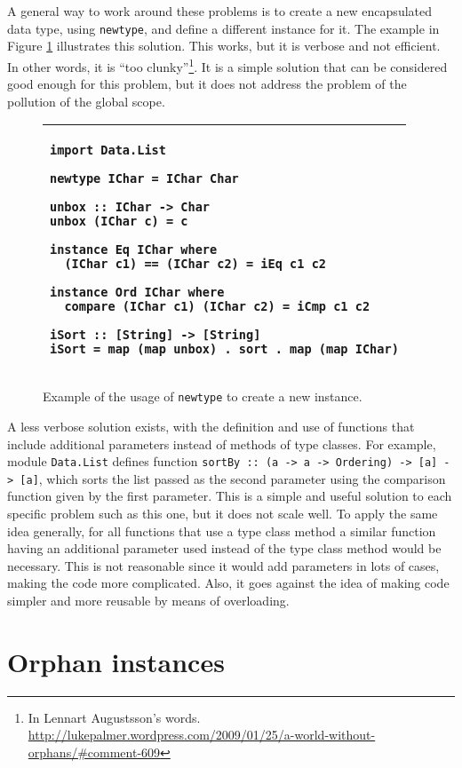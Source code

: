 \documentclass[msc]{ppgccufmg}
\begin{document}
A general way to work around these problems is to create a new encapsulated data type, using \texttt{newtype}, and define a different instance for it.
The example in Figure \ref{newtype} illustrates this solution.  This works, but
it is verbose and not efficient.  In other words, it is ``too
clunky''\footnote{In Lennart Augustsson's
  words. \url{http://lukepalmer.wordpress.com/2009/01/25/a-world-without-orphans/\#comment-609}}.  It is a simple solution that can be considered good enough
for this problem, but it does not address the problem of the pollution of the global
scope.

\begin{figure}
\caption{Example of the usage of \texttt{newtype} to create a new
  instance.\label{newtype}}
\begin{tabular}{|p{\textwidth}|}
\hline
\begin{verbatim}
import Data.List

newtype IChar = IChar Char

unbox :: IChar -> Char
unbox (IChar c) = c

instance Eq IChar where
  (IChar c1) == (IChar c2) = iEq c1 c2

instance Ord IChar where
  compare (IChar c1) (IChar c2) = iCmp c1 c2

iSort :: [String] -> [String]
iSort = map (map unbox) . sort . map (map IChar)
\end{verbatim}
\\
\hline
\end{tabular}
\end{figure}

A less verbose solution exists, with the definition and use of
functions that include additional parameters instead of methods of
type classes. For example, module \texttt{Data.List} defines function
\texttt{sortBy :: (a -> a -> Ordering) -> [a] -> [a]}, which sorts the
list passed as the second parameter using the comparison function
given by the first parameter.  This is a simple and useful solution to
each specific problem such as this one, but it does not scale well.  To apply the same
idea generally, for all functions that use a type class method a
similar function having an additional parameter used instead of the
type class method would be necessary. This is not reasonable since it would add parameters in lots of cases, making the code
more complicated.  Also, it goes against the idea of making code
simpler and more reusable by means of overloading.

\section{Orphan instances}
\label{Orphan-instances}
\end{document}
